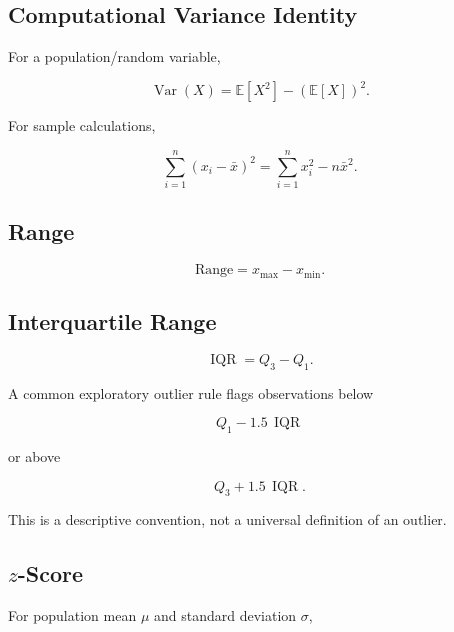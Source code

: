 \subsection{Computational Variance Identity}
\label{subsec:computational-variance-identity}

For a population/random variable,

\[
\boxed{
\operatorname{Var}(X)
=
\mathbb{E}[X^2]
-
(\mathbb{E}[X])^2.
}
\]

For sample calculations,

\[
\boxed{
\sum_{i=1}^{n}
(x_i-\bar{x})^2
=
\sum_{i=1}^{n}x_i^2
-
n\bar{x}^2.
}
\]

\subsection{Range}
\label{subsec:range-statistics-reference}

\[
\boxed{
\text{Range}
=
x_{\max}
-
x_{\min}.
}
\]

\subsection{Interquartile Range}
\label{subsec:iqr-reference}

\[
\boxed{
\operatorname{IQR}
=
Q_3-Q_1.
}
\]

A common exploratory outlier rule flags observations below

\[
\boxed{
Q_1-1.5\,\operatorname{IQR}
}
\]

or above

\[
\boxed{
Q_3+1.5\,\operatorname{IQR}.
}
\]

This is a descriptive convention, not a universal definition of an outlier.

\subsection{\(z\)-Score}
\label{subsec:z-score-reference}

For population mean \(\mu\) and standard deviation \(\sigma\),

